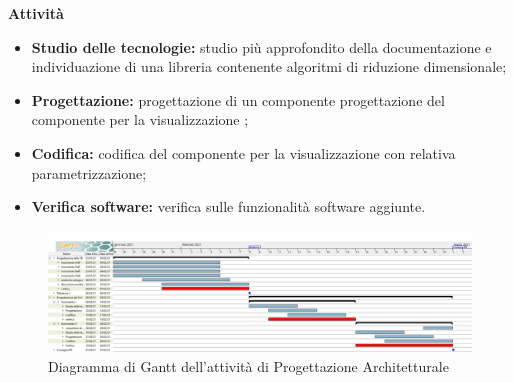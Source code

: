 \textbf{Attività}			

\begin{itemize}

\item \textbf{Studio delle tecnologie:} studio più approfondito della documentazione e individuazione di una libreria contenente algoritmi di riduzione dimensionale;
\item \textbf{Progettazione:} progettazione di un componente progettazione del componente per la visualizzazione ;
\item \textbf{Codifica:} codifica del componente per la visualizzazione con relativa parametrizzazione;
\item \textbf{Verifica software:} verifica sulle funzionalità software aggiunte.
\end{itemize}

\begin{landscape}

\begin{figure}[h]
	\centering	
	\includegraphics[width=\linewidth]{Images/GanttPianificazioneProgettazioneArchitetturale.PNG}
	\caption{Diagramma di Gantt dell'attività di Progettazione Architetturale}
\end{figure}

\end{landscape}



